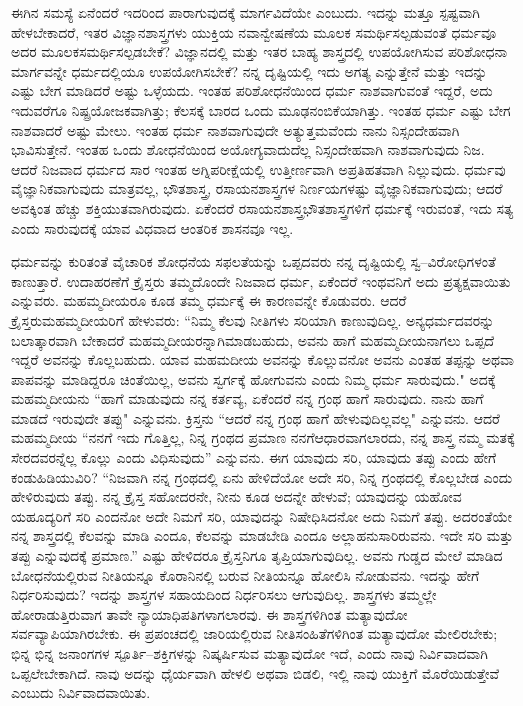 ಈಗಿನ ಸಮಸ್ಯೆ ಏನೆಂದರೆ ಇದರಿಂದ ಪಾರಾಗುವುದಕ್ಕೆ ಮಾರ್ಗವಿದೆಯೇ ಎಂಬುದು. ಇದನ್ನು ಮತ್ತೂ ಸ್ಪಷ್ಟವಾಗಿ ಹೇಳಬೇಕಾದರೆ, ಇತರ ವಿಜ್ಞಾನಶಾಸ್ತ್ರಗಳು ಯುಕ್ತಿಯ ನವಾನ್ವೇಷಣೆಯ ಮೂಲಕ ಸಮರ್ಥಿಸಲ್ಪಡುವಂತೆ ಧರ್ಮವೂ ಅದರ ಮೂಲಕ\break ಸಮರ್ಥಿಸಲ್ಪಡಬೇಕೆ? ವಿಜ್ಞಾನದಲ್ಲಿ ಮತ್ತು ಇತರ ಬಾಹ್ಯ ಶಾಸ್ತ್ರದಲ್ಲಿ ಉಪಯೋಗಿಸುವ ಪರಿಶೋಧನಾ ಮಾರ್ಗವನ್ನೇ ಧರ್ಮದಲ್ಲಿಯೂ ಉಪಯೋಗಿಸಬೇಕೆ? ನನ್ನ ದೃಷ್ಟಿಯಲ್ಲಿ ಇದು ಅಗತ್ಯ ಎನ್ನುತ್ತೇನೆ ಮತ್ತು ಇದನ್ನು ಎಷ್ಟು ಬೇಗ ಮಾಡಿದರೆ ಅಷ್ಟು ಒಳ್ಳೆಯದು. ಇಂತಹ ಪರಿಶೋಧನೆಯಿಂದ ಧರ್ಮ ನಾಶವಾಗುವಂತೆ ಇದ್ದರೆ, ಅದು ಇದುವರೆಗೂ ನಿಷ್ಪ್ರಯೋಜಕವಾಗಿತ್ತು; ಕೆಲಸಕ್ಕೆ ಬಾರದ ಒಂದು ಮೂಢನಂಬಿಕೆಯಾಗಿತ್ತು. ಇಂತಹ ಧರ್ಮ ಎಷ್ಟು ಬೇಗ ನಾಶವಾದರೆ ಅಷ್ಟು ಮೇಲು. ಇಂತಹ ಧರ್ಮ ನಾಶವಾಗುವುದೇ ಅತ್ಯುತ್ತಮವೆಂದು ನಾನು ನಿಸ್ಸಂದೇಹವಾಗಿ ಭಾವಿಸುತ್ತೇನೆ. ಇಂತಹ ಒಂದು ಶೋಧನೆಯಿಂದ ಅಯೋಗ್ಯವಾದುದೆಲ್ಲ ನಿಸ್ಸಂದೇಹವಾಗಿ ನಾಶವಾಗುವುದು ನಿಜ. ಆದರೆ ನಿಜವಾದ ಧರ್ಮದ ಸಾರ ಇಂತಹ ಅಗ್ನಿಪರೀಕ್ಷೆಯಲ್ಲಿ ಉತ್ತೀರ್ಣವಾಗಿ ಅಪ್ರತಿಹತವಾಗಿ ನಿಲ್ಲುವುದು. ಧರ್ಮವು ವೈಜ್ಞಾನಿಕವಾಗುವುದು ಮಾತ್ರವಲ್ಲ, ಭೌತಶಾಸ್ತ್ರ, ರಸಾಯನಶಾಸ್ತ್ರಗಳ ನಿರ್ಣಯಗಳಷ್ಟು ವೈಜ್ಞಾನಿಕವಾಗುವುದು; ಆದರೆ ಅವಕ್ಕಿಂತ ಹೆಚ್ಚು ಶಕ್ತಿಯುತವಾಗಿರುವುದು. ಏಕೆಂದರೆ ರಸಾಯನಶಾಸ್ತ್ರಭೌತಶಾಸ್ತ್ರಗಳಿಗೆ ಧರ್ಮಕ್ಕೆ ಇರುವಂತೆ, ಇದು ಸತ್ಯ ಎಂದು ಸಾರುವುದಕ್ಕೆ ಯಾವ ವಿಧವಾದ ಆಂತರಿಕ ಶಾಸನವೂ ಇಲ್ಲ.

ಧರ್ಮವನ್ನು ಕುರಿತಂತೆ ವೈಚಾರಿಕ ಶೋಧನೆಯ ಸಫಲತೆಯನ್ನು ಒಪ್ಪದವರು ನನ್ನ ದೃಷ್ಟಿಯಲ್ಲಿ ಸ್ವ–ವಿರೋಧಿಗಳಂತೆ ಕಾಣುತ್ತಾರೆ. ಉದಾಹರಣೆಗೆ ಕ್ರೈಸ್ತರು ತಮ್ಮದೊಂದೇ ನಿಜವಾದ ಧರ್ಮ, ಏಕೆಂದರೆ ಇಂಥವನಿಗೆ ಅದು ಪ್ರತ್ಯಕ್ಷವಾಯಿತು ಎನ್ನುವರು. ಮಹಮ್ಮದೀಯರೂ ಕೂಡ ತಮ್ಮ ಧರ್ಮಕ್ಕೆ ಈ ಕಾರಣವನ್ನೇ ಕೊಡುವರು. ಆದರೆ ಕ್ರೈಸ್ತರು\break ಮಹಮ್ಮದೀಯರಿಗೆ ಹೇಳುವರು: “ನಿಮ್ಮ ಕೆಲವು ನೀತಿಗಳು ಸರಿಯಾಗಿ ಕಾಣುವುದಿಲ್ಲ. ಅನ್ಯಧರ್ಮದವರನ್ನು ಬಲಾತ್ಕಾರವಾಗಿ ಬೇಕಾದರೆ ಮಹಮ್ಮದೀಯರನ್ನಾಗಿ\break ಮಾಡಬಹುದು, ಅವನು ಹಾಗೆ ಮಹಮ್ಮದೀಯನಾಗಲು ಒಪ್ಪದೆ ಇದ್ದರೆ ಅವನನ್ನು ಕೊಲ್ಲಬಹುದು. ಯಾವ ಮಹಮದೀಯ ಅವನನ್ನು ಕೊಲ್ಲುವನೋ ಅವನು ಎಂತಹ ತಪ್ಪನ್ನು ಅಥವಾ ಪಾಪವನ್ನು ಮಾಡಿದ್ದರೂ ಚಿಂತೆಯಿಲ್ಲ, ಅವನು ಸ್ವರ್ಗಕ್ಕೆ ಹೋಗುವನು ಎಂದು ನಿಮ್ಮ ಧರ್ಮ ಸಾರುವುದು." ಅದಕ್ಕೆ ಮಹಮ್ಮದೀಯನು “ಹಾಗೆ ಮಾಡುವುದು ನನ್ನ ಕರ್ತವ್ಯ, ಏಕೆಂದರೆ ನನ್ನ ಗ್ರಂಥ ಹಾಗೆ ಸಾರುವುದು. ನಾನು ಹಾಗೆ ಮಾಡದೆ ಇರುವುದೇ ತಪ್ಪು" ಎನ್ನುವನು. ಕ್ರಿಸ್ತನು “ಆದರೆ ನನ್ನ ಗ್ರಂಥ ಹಾಗೆ ಹೇಳುವುದಿಲ್ಲವಲ್ಲ" ಎನ್ನುವನು. ಆದರೆ ಮಹಮ್ಮದೀಯ “ನನಗೆ ಇದು ಗೊತ್ತಿಲ್ಲ, ನಿನ್ನ ಗ್ರಂಥದ ಪ್ರಮಾಣ ನನಗೆ\break ಆಧಾರವಾಗಲಾರದು, ನನ್ನ ಶಾಸ್ತ್ರ ನಮ್ಮ ಮತಕ್ಕೆ ಸೇರದವರನ್ನೆಲ್ಲ ಕೊಲ್ಲು ಎಂದು ವಿಧಿಸುವುದು'' ಎನ್ನುವನು. ಈಗ ಯಾವುದು ಸರಿ, ಯಾವುದು ತಪ್ಪು ಎಂದು ಹೇಗೆ ಕಂಡುಹಿಡಿಯುವಿರಿ? “ನಿಜವಾಗಿ ನನ್ನ ಗ್ರಂಥದಲ್ಲಿ ಏನು ಹೇಳಿದೆಯೋ ಅದೇ ಸರಿ, ನಿನ್ನ ಗ್ರಂಥದಲ್ಲಿ ಕೊಲ್ಲಬೇಡ ಎಂದು ಹೇಳಿರುವುದು ತಪ್ಪು. ನನ್ನ ಕ್ರೈಸ್ತ ಸಹೋದರನೇ, ನೀನು ಕೂಡ ಅದನ್ನೇ ಹೇಳುವೆ; ಯಾವುದನ್ನು ಯಹೋವ ಯಹೂದ್ಯರಿಗೆ ಸರಿ ಎಂದನೋ ಅದೇ ನಿಮಗೆ ಸರಿ, ಯಾವುದನ್ನು ನಿಷೇಧಿಸಿದನೋ ಅದು ನಿಮಗೆ ತಪ್ಪು. ಅದರಂತೆಯೇ ನನ್ನ ಶಾಸ್ತ್ರದಲ್ಲಿ ಕೆಲವನ್ನು ಮಾಡಿ ಎಂದೂ, ಕೆಲವನ್ನು ಮಾಡಬೇಡಿ ಎಂದೂ ಅಲ್ಲಾಹನು\break ಸಾರಿರುವನು. ಇದೇ ಸರಿ ಮತ್ತು ತಪ್ಪು ಎನ್ನುವುದಕ್ಕೆ ಪ್ರಮಾಣ.” ಎಷ್ಟು ಹೇಳಿದರೂ ಕ್ರೈಸ್ತನಿಗೂ ತೃಪ್ತಿಯಾಗುವುದಿಲ್ಲ. ಅವನು ಗುಡ್ಡದ ಮೇಲೆ ಮಾಡಿದ ಬೋಧನೆಯಲ್ಲಿರುವ ನೀತಿಯನ್ನೂ ಕೊರಾನಿನಲ್ಲಿ ಬರುವ ನೀತಿಯನ್ನೂ ಹೋಲಿಸಿ ನೋಡುವನು. ಇದನ್ನು ಹೇಗೆ ನಿರ್ಧರಿಸುವುದು? ಇದನ್ನು ಶಾಸ್ತ್ರಗಳ ಸಹಾಯದಿಂದ ನಿರ್ಧರಿಸಲು ಆಗುವುದಿಲ್ಲ. ಶಾಸ್ತ್ರಗಳು ತಮ್ಮಲ್ಲೇ ಹೋರಾಡುತ್ತಿರುವಾಗ ತಾವೇ ನ್ಯಾಯಾಧಿಪತಿಗಳಾಗಲಾರವು. ಈ ಶಾಸ್ತ್ರಗಳಿಗಿಂತ ಮತ್ಯಾವುದೋ ಸರ್ವವ್ಯಾಪಿಯಾಗಿರಬೇಕು. ಈ ಪ್ರಪಂಚದಲ್ಲಿ ಜಾರಿಯಲ್ಲಿರುವ ನೀತಿಸಂಹಿತೆಗಳಿಗಿಂತ ಮತ್ಯಾವುದೋ ಮೇಲಿರಬೇಕು; ಭಿನ್ನ ಭಿನ್ನ ಜನಾಂಗಗಳ ಸ್ಪೂರ್ತಿ–ಶಕ್ತಿಗಳನ್ನು ನಿಷ್ಕರ್ಷಿಸುವ ಮತ್ಯಾವುದೋ ಇದೆ, ಎಂದು ನಾವು ನಿರ್ವಿವಾದವಾಗಿ ಒಪ್ಪಲೇಬೇಕಾಗಿದೆ. ನಾವು ಅದನ್ನು ಧೈರ್ಯವಾಗಿ ಹೇಳಲಿ ಅಥವಾ ಬಿಡಲಿ, ಇಲ್ಲಿ ನಾವು ಯುಕ್ತಿಗೆ ಮೊರೆಯಿಡುತ್ತೇವೆ ಎಂಬುದು ನಿರ್ವಿವಾದವಾಯಿತು.

